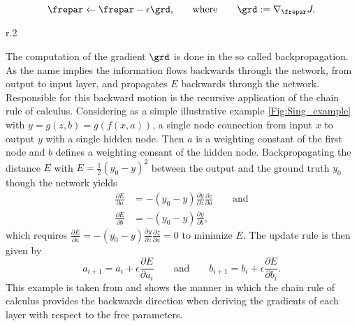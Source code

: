\begin{equation}
	\frepar \leftarrow \frepar - \epsilon\grd\mathrm{,} \qquad\mathrm{where}\qquad \grd:= \nabla_{\frepar}J\mathrm{.}
\end{equation}
\begin{wrapfigure}{r}{.2\textwidth}
	\centering
	\vspace{-10pt}
	
	\vspace{-5pt}
	\caption{\footnotesize A single node network with one hidden node between input and output node.}
	\label{Fig:Sing_example}
\end{wrapfigure}
The computation of the gradient \(\grd\) is done in the so called backpropagation. As the name implies the information flows backwards through the network, from output to input layer, and propagates \(E\) backwards through the network. Responsible for this backward motion is the recursive application of the chain rule of calculus. Considering as a simple illustrative example \cref{Fig:Sing_example} with \(y=g(z,b)=g(f(x,a))\), a single node connection from input \(x\) to output \(y\) with a single hidden node. Then \(a\) is a weighting constant of the first node and \(b\) defines a weighting consant of the hidden node. Backpropagating the distance \(E\) with \(E = \frac{1}{2}(y_0 -y)^2\) between the output and the ground truth \(y_0\) though the network yields
\begin{align}
	\frac{\partial E}{\partial a} &= -(y_0 - y)\frac{\partial y}{\partial z}\frac{\partial z}{\partial a}\qquad \mathrm{and}\\
	\frac{\partial E}{\partial b} &= -(y_0 - y)\frac{\partial y}{\partial b}\mathrm{,}
\end{align}
which requires \(\frac{\partial E}{\partial a} = -(y_0 - y)\frac{\partial y}{\partial z}\frac{\partial z}{\partial a} = 0\) to minimize \(E\). The update rule is then given by
\begin{equation}
	a_{i+1} = a_i + \epsilon \frac{\partial E}{\partial a_i} \qquad\mathrm{and}\qquad
	b_{i+1} = b_i + \epsilon \frac{\partial E}{\partial b_i}\mathrm{.}
\end{equation}
This example is taken from \cite{Kutz} and shows the manner in which the chain rule of calculus provides the backwards direction when deriving the gradients of each layer with respect to the free parameters.\\
